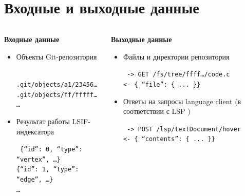 \documentclass[aspectratio=169,professionalfonts,10pt]{beamer}
\begin{document}
\section{Входные и выходные данные}
\begin{frame}[t]{\insertsection}

\begin{columns}
    \begin{column}{0.5\textwidth}
        \textbf{Входные данные}
        \begin{itemize}
            \item Объекты Git-репозитория
            \begin{tcolorbox}%
                \texttt{%
                    .git/objects/a1/23456… \\
                    .git/objects/ff/fffff… \\
                    …
                }
            \end{tcolorbox}
            \item Результат работы LSIF-индексатора
            \begin{tcolorbox}%
                \texttt{%
                    \{``id'': 0, ``type'': ``vertex'', …\} \\
                    \{``id'': 1, ``type'': ``edge'', …\} \\
                    …
                }
            \end{tcolorbox}
        \end{itemize}
    \end{column}
    \begin{column}{0.5\textwidth}
        \textbf{Выходные данные}
        \begin{itemize}
            \item Файлы и директории репозитория
                \begin{tcolorbox}%
                    \texttt{%
                        -> GET /fs/tree/ffff…/code.c \\
                        <- \{ ``file'': \{ ... \}\} 
                    }
                \end{tcolorbox}
            \item Ответы на запросы language client (в соответствии с LSP \cite{lsp}) \\
                \begin{tcolorbox}%
                    \texttt{%
                        -> POST /lsp/textDocument/hover \\
                        <- \{ ``contents'': \{ ... \}\} 
                    }
                \end{tcolorbox}
        \end{itemize}
    \end{column}
\end{columns}

\end{frame}
\end{document}
